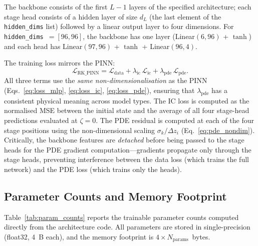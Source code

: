 \documentclass[a4paper,11pt]{article}
\newcommand{\SI}[2]{#1~#2}
\newcommand{\byte}{B}
\newcommand{\dz}{\Delta z}
\newcommand{\loss}{\mathcal{L}}
\begin{document}
The backbone consists of the first $L-1$ layers of the specified
architecture; each stage head consists of a hidden layer of size
$d_{L}$ (the last element of the \texttt{hidden\_dims} list) followed
by a linear output layer to four dimensions.  For
\texttt{hidden\_dims}~$= [96, 96]$, the backbone has one layer
(Linear$(6, 96)$ + $\tanh$) and each head has
Linear$(97, 96)$ + $\tanh$ + Linear$(96, 4)$.

The training loss mirrors the PINN:
\begin{equation}
  \loss_\text{RK\_PINN} = \loss_\text{data}
    + \lambda_\text{ic}\,\loss_\text{ic}
    + \lambda_\text{pde}\,\loss_\text{pde}.
  \label{eq:loss_rkpinn}
\end{equation}
All three terms use the \emph{same non-dimensionalisation} as the PINN
(Eqs.~\ref{eq:loss_mlp}, \ref{eq:loss_ic}, \ref{eq:loss_pde}), ensuring
that $\lambda_\text{pde}$ has a consistent physical meaning across model
types.
The IC loss is computed as the normalised MSE between the initial state and the
average of all four stage-head predictions evaluated at $\zeta = 0$.
The PDE residual is computed at each of the four stage positions using
the non-dimensional scaling $\sigma_k / \dz_i$ (Eq.~\ref{eq:pde_nondim}).
Critically, the backbone features are \emph{detached} before being
passed to the stage heads for the PDE gradient computation---gradients
propagate only through the stage heads, preventing interference between
the data loss (which trains the full network) and the PDE loss (which
trains only the heads).

\subsection{Parameter Counts and Memory Footprint}
\label{sec:param_counts}

Table~\ref{tab:param_counts} reports the trainable parameter counts
computed directly from the architecture code.  All parameters are stored
in single-precision (float32, \SI{4}{\byte} each), and the memory
footprint is $4 \times N_\text{params}$~bytes.
\end{document}
